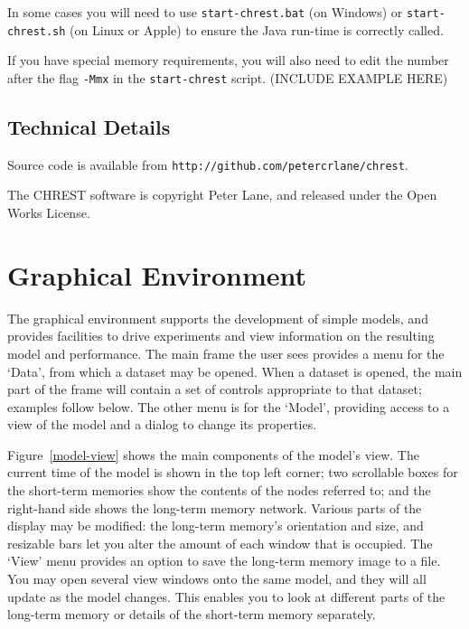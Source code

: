 \documentclass{article}
\begin{document}
In some cases you will need to use {\tt start-chrest.bat} (on Windows) or 
{\tt start-chrest.sh} (on Linux or Apple) to ensure the Java run-time is correctly 
called.

If you have special memory requirements, you will also need to edit the number 
after the flag {\tt -Mmx} in the {\tt start-chrest} script. (INCLUDE EXAMPLE HERE)

\subsection{Technical Details}

Source code is available from {\tt http://github.com/petercrlane/chrest}.

\noindent The CHREST software is copyright Peter Lane, and released under the
Open Works License.


\section{Graphical Environment}

The graphical environment supports the development of simple models, and
provides facilities to drive experiments and view information on the resulting
model and performance.  The main frame the user sees provides a menu for the
`Data', from which a dataset may be opened.  When a dataset is opened, the main
part of the frame will contain a set of controls appropriate to that dataset;
examples follow below.  The other menu is for the `Model', providing access to
a view of the model and a dialog to change its properties.

Figure~\ref{model-view} shows the main components of the model's view.  The
current time of the model is shown in the top left corner; two scrollable boxes
for the short-term memories show the contents of the nodes referred to; and the
right-hand side shows the long-term memory network.  Various parts of the
display may be modified: the long-term memory's orientation and size, and
resizable bars let you alter the amount of each window that is occupied.  The
`View' menu provides an option to save the long-term memory image to a file.
You may open several view windows onto the same model, and they will all update
as the model changes.  This enables you to look at different parts of the
long-term memory or details of the short-term memory separately.
\end{document}
